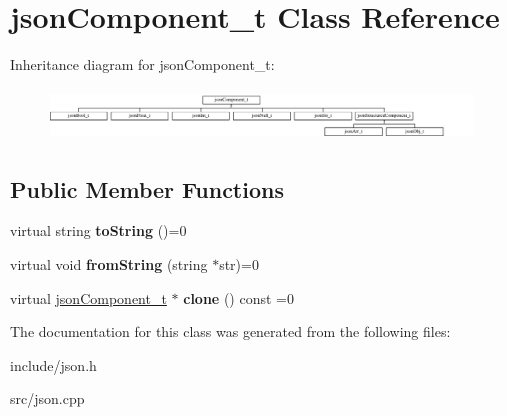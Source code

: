 \hypertarget{classjsonComponent__t}{\section{json\-Component\-\_\-t \-Class \-Reference}
\label{classjsonComponent__t}
}
\-Inheritance diagram for json\-Component\-\_\-t\-:\begin{figure}[H]
\begin{center}
\leavevmode
\includegraphics[height=1.371429cm]{classjsonComponent__t}
\end{center}
\end{figure}
\subsection*{\-Public \-Member \-Functions}
\begin{DoxyCompactItemize}
\item 
\hypertarget{classjsonComponent__t_ae04e41672ec37bd38ccb14adb1899d02}{virtual string {\bfseries to\-String} ()=0}\label{classjsonComponent__t_ae04e41672ec37bd38ccb14adb1899d02}

\item 
\hypertarget{classjsonComponent__t_a6f0cd609f5567924cd57f515d0b5f6bc}{virtual void {\bfseries from\-String} (string $\ast$str)=0}\label{classjsonComponent__t_a6f0cd609f5567924cd57f515d0b5f6bc}

\item 
\hypertarget{classjsonComponent__t_a790bcc501ccf616768a5c9ffc2d46b51}{virtual \hyperlink{classjsonComponent__t}{json\-Component\-\_\-t} $\ast$ {\bfseries clone} () const =0}\label{classjsonComponent__t_a790bcc501ccf616768a5c9ffc2d46b51}

\end{DoxyCompactItemize}


\-The documentation for this class was generated from the following files\-:\begin{DoxyCompactItemize}
\item 
include/json.\-h\item 
src/json.\-cpp\end{DoxyCompactItemize}
